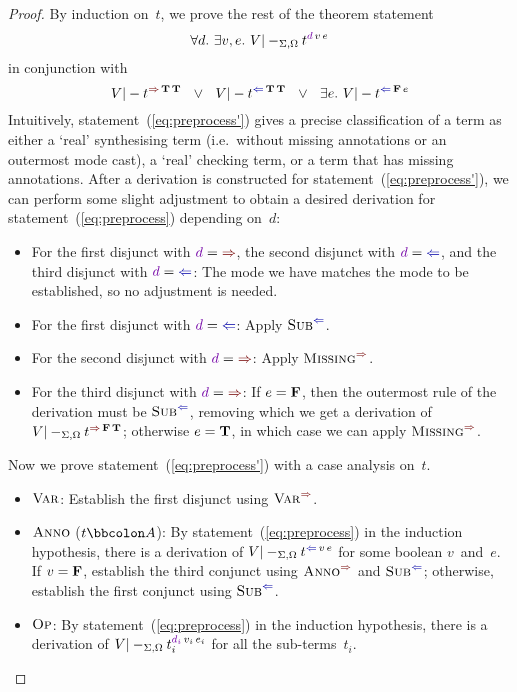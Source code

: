 \begin{proof}
By induction on~$t$, we prove the rest of the theorem statement
\begin{equation}\label{eq:preprocess}
\forall d.~\exists v, e.~V |-_{\Sigma,\Omega} t^{\dir{d}\,v\,e}
\end{equation}
in conjunction with
\begin{equation}\label{eq:preprocess'}
V |- t^{\syn\,\True\,\True} ~~\vee~~ V |- t^{\chk\,\True\,\True} ~~\vee~~ \exists e.~V |- t^{\chk\,\False\,e}
\end{equation}
Intuitively, statement~(\ref{eq:preprocess'}) gives a precise classification of a term as either a `real' synthesising term (i.e.~without missing annotations or an outermost mode cast), a `real' checking term, or a term that has missing annotations.
After a derivation is constructed for statement~(\ref{eq:preprocess'}), we can perform some slight adjustment to obtain a desired derivation for statement~(\ref{eq:preprocess}) depending on~$d$:
\begin{itemize}
\item For the first disjunct with $\dir{d} = {\syn}$, the second disjunct with $\dir{d} = {\chk}$, and the third disjunct with $\dir{d} = {\chk}$:
The mode we have matches the mode to be established, so no adjustment is needed.
\item For the first disjunct with $\dir{d} = {\chk}$:
Apply $\ChkRule{Sub}$.
\item For the second disjunct with $\dir{d} = {\syn}$:
Apply $\SynRule{Missing}$.
\item For the third disjunct with $\dir{d} = {\syn}$:
If $e = \mathbf{F}$, then the outermost rule of the derivation must be $\ChkRule{Sub}$, removing which we get a derivation of $V |-_{\Sigma,\Omega} t^{\syn\,\False\,\True}$;
otherwise $e = \mathbf{T}$, in which case we can apply $\SynRule{Missing}$.
\end{itemize}
Now we prove statement~(\ref{eq:preprocess'}) with a case analysis on~$t$.
\begin{itemize}
\item $\textnormal{\textsc{Var}}$:
Establish the first disjunct using $\SynRule{Var}$.
\item $\textnormal{\textsc{Anno}}$ ($t \bbcolon A$):
By statement~(\ref{eq:preprocess}) in the induction hypothesis, there is a derivation of $V |-_{\Sigma,\Omega} t^{\chk\,v\,e}$ for some boolean $v$~and~$e$.
If $v = \mathbf{F}$, establish the third conjunct using $\SynRule{Anno}$ and $\ChkRule{Sub}$; otherwise, establish the first conjunct using $\ChkRule{Sub}$.
\item $\textnormal{\textsc{Op}}$:
By statement~(\ref{eq:preprocess}) in the induction hypothesis, there is a derivation of $V |-_{\Sigma,\Omega} t_i^{\dir{d_i}\,v_i\,e_i}$ for all the sub-terms~$t_i$.
\end{itemize}
\end{proof}

